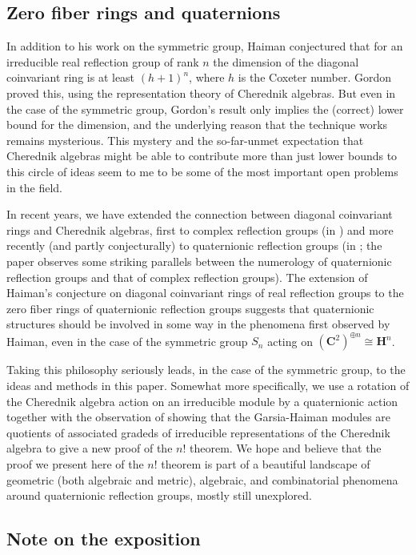 \documentclass[12pt, reqno]{amsart}
\numberwithin{equation}{section}
\theoremstyle{definition}
\theoremstyle{plain}
\newcommand{\CC}{\mathbf{C}}
\newcommand{\HH}{\mathbf{H}}
\begin{document}
\subsection{Zero fiber rings and quaternions} 

In addition to his work on the symmetric group, Haiman conjectured that for an irreducible real reflection group of rank $n$ the dimension of the diagonal coinvariant ring is at least $(h+1)^n$, where $h$ is the Coxeter number. Gordon \cite{Gor} proved this, using the representation theory of Cherednik algebras. But even in the case of the symmetric group, Gordon's result only implies the (correct) lower bound for the dimension, and the underlying reason that the technique works remains mysterious. This mystery and the so-far-unmet expectation that Cherednik algebras might be able to contribute more than just lower bounds to this circle of ideas seem to me to be some of the most important open problems in the field.

In recent years, we have extended the connection between diagonal coinvariant rings and Cherednik algebras, first to complex reflection groups (in \cite{Gri2}) and more recently (and partly conjecturally) to quaternionic reflection groups (in \cite{CaGr}; the paper \cite{GrGu} observes some striking parallels between the numerology of quaternionic reflection groups and that of complex reflection groups). The extension of Haiman's conjecture on diagonal coinvariant rings of real reflection groups to the zero fiber rings of quaternionic reflection groups suggests that quaternionic structures should be involved in some way in the phenomena first observed by Haiman, even in the case of the symmetric group $S_n$ acting on $(\CC^2)^{\oplus n} \cong \HH^n$.

Taking this philosophy seriously leads, in the case of the symmetric group, to the ideas and methods in this paper. Somewhat more specifically, we use a rotation of the Cherednik algebra action on an irreducible module by a quaternionic action together with the observation of \cite{Gri1} showing that the Garsia-Haiman modules are quotients of associated gradeds of irreducible representations of the Cherednik algebra to give a new proof of the $n!$ theorem. We hope and believe that the proof we present here of the $n!$ theorem is part of a beautiful landscape of geometric (both algebraic and metric), algebraic, and combinatorial phenomena around quaternionic reflection groups, mostly still unexplored. 

\subsection{Note on the exposition} 
\end{document}

